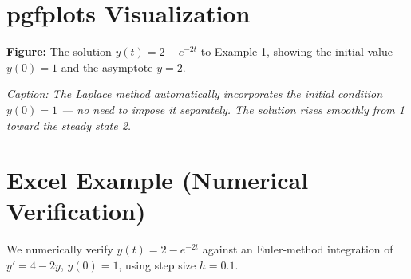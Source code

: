 \documentclass[12pt,a4paper]{article}
\begin{document}
\section{pgfplots Visualization}

\textbf{Figure:} The solution $y(t) = 2 - e^{-2t}$ to Example 1,
showing the initial value $y(0)=1$ and the asymptote $y=2$.

\begin{center}
\end{center}

\textit{Caption: The Laplace method automatically incorporates the
initial condition $y(0)=1$ --- no need to impose it separately. The
solution rises smoothly from 1 toward the steady state 2.}

\section{Excel Example (Numerical Verification)}

We numerically verify $y(t) = 2 - e^{-2t}$ against an Euler-method
integration of $y' = 4 - 2y$, $y(0) = 1$, using step size $h = 0.1$.
\end{document}
